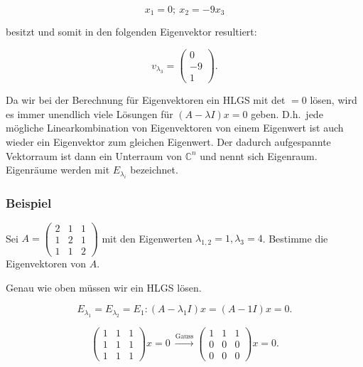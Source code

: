 \begin{equation*}
        x_1 = 0;\ x_2 = -9 x_3 
\end{equation*}

besitzt und somit in den folgenden Eigenvektor resultiert:

\begin{equation*}
        v_{\lambda_3} = \begin{pmatrix} 0 \\ -9 \\ 1 \end{pmatrix}.
\end{equation*}

Da wir bei der Berechnung für Eigenvektoren ein HLGS mit det \(= 0 \) lösen, wird es immer unendlich viele Lösungen für \( (A-\lambda I) x = 0 \) geben. D.h.\ jede mögliche Linearkombination von Eigenvektoren von einem Eigenwert ist auch wieder ein Eigenvektor zum gleichen Eigenwert. Der dadurch aufgespannte Vektorraum ist dann ein Unterraum von \( \mathbb{C}^n \) und nennt sich Eigenraum. Eigenräume werden mit \( E_{\lambda_i} \) bezeichnet.

\subsubsection*{Beispiel}

Sei \( A = \begin{pmatrix} 2 & 1 & 1 \\ 1 & 2 & 1 \\ 1 & 1 & 2 \end{pmatrix} \) mit den Eigenwerten \( \lambda_{1,2} = 1, \lambda_3 = 4 \). Bestimme die Eigenvektoren von \( A \).

\vspace{1\baselineskip}

Genau wie oben müssen wir ein HLGS lösen.

\begin{equation*}
    E_{\lambda_1} = E_{\lambda_2} = E_{1}: (A - \lambda_1 I) x = (A - 1I) x = 0.
\end{equation*}

\begin{equation*}
    \begin{pmatrix} 1 & 1 & 1 \\ 1 & 1 & 1 \\ 1 & 1 & 1 \end{pmatrix} x = 0 \ \xrightarrow[]{\text{Gauss}} \begin{pmatrix} 1 & 1 & 1 \\ 0 & 0 & 0 \\ 0 & 0 & 0 \end{pmatrix} x = 0.
\end{equation*}

